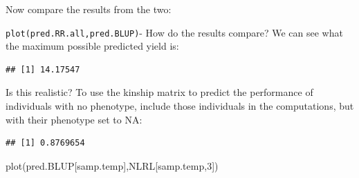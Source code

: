 \documentclass[
]{book}
\newenvironment{Shaded}{\begin{snugshade}}{\end{snugshade}}
\newcommand{\AttributeTok}[1]{\textcolor[rgb]{0.77,0.63,0.00}{#1}}
\newcommand{\ConstantTok}[1]{\textcolor[rgb]{0.00,0.00,0.00}{#1}}
\newcommand{\DecValTok}[1]{\textcolor[rgb]{0.00,0.00,0.81}{#1}}
\newcommand{\FunctionTok}[1]{\textcolor[rgb]{0.00,0.00,0.00}{#1}}
\newcommand{\NormalTok}[1]{#1}
\newcommand{\OtherTok}[1]{\textcolor[rgb]{0.56,0.35,0.01}{#1}}
\newcommand{\SpecialCharTok}[1]{\textcolor[rgb]{0.00,0.00,0.00}{#1}}
\begin{document}
Now compare the results from the two:

\texttt{plot(pred.RR.all,pred.BLUP)}- How do the results compare? We can see what the maximum possible predicted yield is:

\begin{Shaded}
\end{Shaded}

\begin{verbatim}
## [1] 14.17547
\end{verbatim}

Is this realistic? To use the kinship matrix to predict the performance of individuals with no phenotype, include those individuals in the computations, but with their phenotype set to NA:

\begin{Shaded}
\end{Shaded}

\begin{verbatim}
## [1] 0.8769654
\end{verbatim}

\begin{Shaded}
\begin{Highlighting}[]
\FunctionTok{plot}\NormalTok{(pred.BLUP[samp.temp],NLRL[samp.temp,}\DecValTok{3}\NormalTok{])}
\end{Highlighting}
\end{Shaded}
\end{document}
